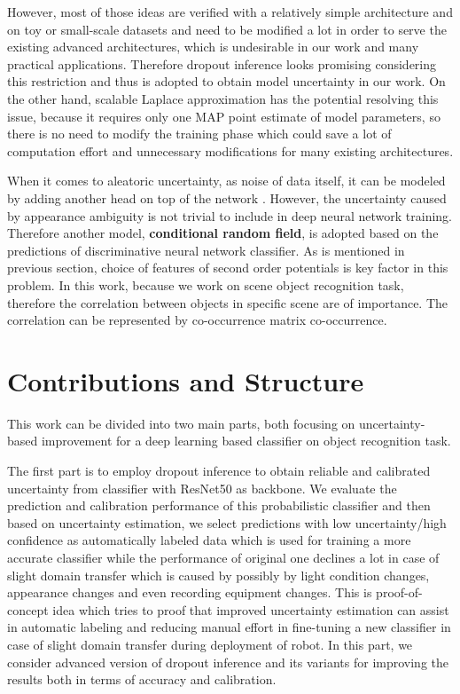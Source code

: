 However, most of those ideas are verified with a relatively simple architecture and on toy or small-scale datasets and need to be modified a lot in order to serve the existing advanced architectures, which is undesirable in our work and many practical applications. Therefore dropout inference\cite{gal2016dropout} looks promising considering this restriction and thus is adopted to obtain model uncertainty in our work. On the other hand, scalable Laplace approximation \cite{ritter2018scalable} has the potential resolving this issue, because it requires only one MAP point estimate of model parameters, so there is no need to modify the training phase which could save a lot of computation effort and unnecessary modifications for many existing architectures.

When it comes to aleatoric uncertainty, as noise of data itself, it can be modeled by adding another head on top of the network \cite{kendall2017uncertainties}. However, the uncertainty caused by appearance ambiguity is not trivial to include in deep neural network training. Therefore another model, \textbf{conditional random field}\cite{lafferty2001conditional}, is adopted based on the predictions of discriminative neural network classifier. As is mentioned in previous section, choice of features of second order potentials is key factor in this problem. In this work, because we work on scene object recognition task, therefore the correlation between objects in specific scene are of importance. The correlation can be represented by co-occurrence matrix co-occurrence\cite{ladicky2010graph}\cite{rasiwasia2009holistic}\cite{galleguillos2008object}\cite{rabinovich2007objects}.

\section{Contributions and Structure}
This work can be divided into two main parts, both focusing on uncertainty-based improvement for a deep learning based classifier on object recognition task. 

The first part is to employ dropout inference to obtain reliable and calibrated uncertainty from classifier with ResNet50\cite{he2016deep} as backbone. We evaluate the prediction and calibration performance of this probabilistic classifier and then based on uncertainty estimation, we select predictions with low uncertainty/high confidence as automatically labeled data which is used for training a more accurate classifier while the performance of original one declines a lot in case of slight domain transfer which is caused by possibly by light condition changes, appearance changes and even recording equipment changes. This is proof-of-concept idea which tries to proof that improved uncertainty estimation can assist in automatic labeling and reducing manual effort in fine-tuning a new classifier in case of slight domain transfer during deployment of robot. In this part, we consider advanced version of dropout inference and its variants for improving the results both in terms of accuracy and calibration. 

